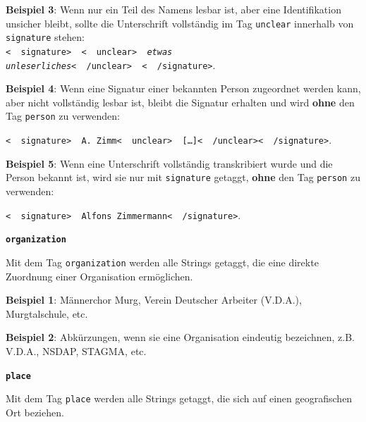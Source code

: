 \documentclass[12pt, a4paper, ngerman, bidi=default]{article}
\begin{document}
\begin{description}
    
    \textbf{ Beispiel 3}: Wenn nur ein Teil des Namens lesbar ist, aber eine Identifikation unsicher bleibt, sollte die Unterschrift 
    vollständig im Tag \texttt{\colorbox{unclear}{unclear}} innerhalb von \texttt{\colorbox{signature}{signature}} stehen:\\

    \colorbox{VeryLightGray}
    {\texttt{\textless\ \  signature\textgreater\ \  \textless\ \  unclear\textgreater\ \  \textit{etwas unleserliches}\textless\ \  /unclear\textgreater\ \  \textless\ \  /signature\textgreater}.} 
    
    \textbf{ Beispiel 4}: Wenn eine Signatur einer bekannten Person zugeordnet werden kann, aber nicht vollständig lesbar ist, bleibt die Signatur erhalten und wird \textbf{ohne} den Tag \texttt{\colorbox{person}{person}} zu verwenden: 

    \colorbox{VeryLightGray}{\texttt{\textless\ \  signature\textgreater\ \  A. Zimm\textless\ \  unclear\textgreater\ \  [\ldots]\textless\ \  /unclear\textgreater\textless\ \  /signature\textgreater}.} 
    
    \textbf{ Beispiel 5}: Wenn eine Unterschrift vollständig transkribiert wurde und die Person bekannt ist, wird sie nur mit \texttt{\colorbox{signature}{signature}} getaggt, \textbf{ohne} den Tag \texttt{\colorbox{person}{person}} zu verwenden:  

    \colorbox{VeryLightGray}{\texttt{\textless\ \  signature\textgreater\ \  Alfons Zimmermann\textless\ \  /signature\textgreater}.} 
    
    \item\texttt{\textbf{{\colorbox{organization}{organization}}}}
        
    Mit dem Tag \texttt{\colorbox{organization}{organization}} werden alle Strings getaggt, die eine direkte Zuordnung einer Organisation ermöglichen.  
    
    \noindent \textbf{ Beispiel 1}: Männerchor Murg, Verein Deutscher Arbeiter (V.D.A.), Murgtalschule, etc.

    \textbf{ Beispiel 2}: Abkürzungen, wenn sie eine Organisation eindeutig bezeichnen, z.B. V.D.A., NSDAP, STAGMA, etc.
    

    \item\texttt{\textbf{{\colorbox{place}{place}}}}
        
    Mit dem Tag \texttt{\colorbox{place}{place}} werden alle Strings getaggt, die sich auf einen geografischen Ort beziehen.  
    

\end{description}
\end{document}

